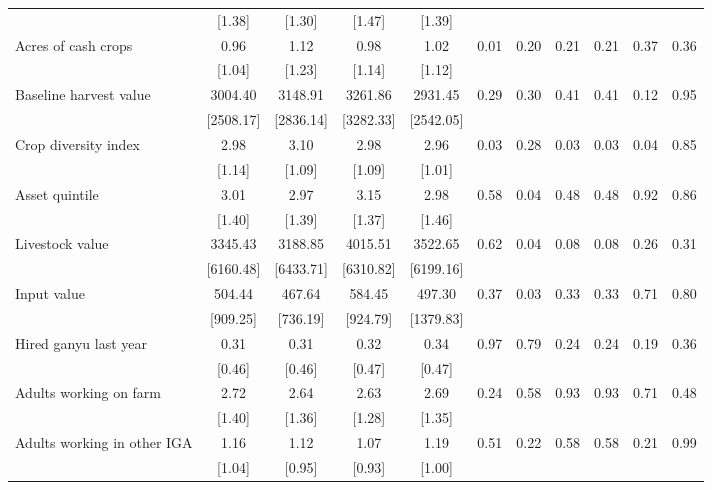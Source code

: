 \begin{tabular}{l cc cc cc cc cc}
 & [1.38] & [1.30] & [1.47] & [1.39] & & & & & & \\ 
Acres of cash crops & 0.96     & 1.12     & 0.98     & 1.02     & 0.01 & 0.20 & 0.21 & 0.21 & 0.37 & 0.36 \\ 
 & [1.04] & [1.23] & [1.14] & [1.12] & & & & & & \\ 
Baseline harvest value & 3004.40  & 3148.91  & 3261.86  & 2931.45  & 0.29 & 0.30 & 0.41 & 0.41 & 0.12 & 0.95 \\ 
 & [2508.17] & [2836.14] & [3282.33] & [2542.05] & & & & & & \\ 
Crop diversity index & 2.98     & 3.10     & 2.98     & 2.96     & 0.03 & 0.28 & 0.03 & 0.03 & 0.04 & 0.85 \\ 
 & [1.14] & [1.09] & [1.09] & [1.01] & & & & & & \\ 
Asset quintile & 3.01     & 2.97     & 3.15     & 2.98     & 0.58 & 0.04 & 0.48 & 0.48 & 0.92 & 0.86 \\ 
 & [1.40] & [1.39] & [1.37] & [1.46] & & & & & & \\ 
Livestock value & 3345.43  & 3188.85  & 4015.51  & 3522.65  & 0.62 & 0.04 & 0.08 & 0.08 & 0.26 & 0.31 \\ 
 & [6160.48] & [6433.71] & [6310.82] & [6199.16] & & & & & & \\ 
Input value & 504.44   & 467.64   & 584.45   & 497.30   & 0.37 & 0.03 & 0.33 & 0.33 & 0.71 & 0.80 \\ 
 & [909.25] & [736.19] & [924.79] & [1379.83] & & & & & & \\ 
Hired ganyu last year & 0.31     & 0.31     & 0.32     & 0.34     & 0.97 & 0.79 & 0.24 & 0.24 & 0.19 & 0.36 \\ 
 & [0.46] & [0.46] & [0.47] & [0.47] & & & & & & \\ 
Adults working on farm & 2.72     & 2.64     & 2.63     & 2.69     & 0.24 & 0.58 & 0.93 & 0.93 & 0.71 & 0.48 \\ 
 & [1.40] & [1.36] & [1.28] & [1.35] & & & & & & \\ 
Adults working in other IGA & 1.16     & 1.12     & 1.07     & 1.19     & 0.51 & 0.22 & 0.58 & 0.58 & 0.21 & 0.99 \\ 
 & [1.04] & [0.95] & [0.93] & [1.00] & & & & & & \\ 
\hline
\end{tabular}
